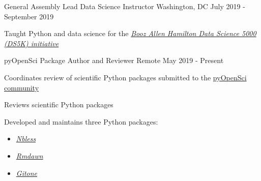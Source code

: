 \begin{cventries}
  \cventry
    {General Assembly} %
    {Lead Data Science Instructor} %
    {Washington, DC} %
    {July 2019 - September 2019} %
    {
      \begin{cvitems} %
        \item {Taught Python and data science for the \href{https://generalassemb.ly/booz-allen-hamilton}{\textcolor{awesome-skyblue}{\textit{Booz Allen Hamilton Data Science 5000 (DS5K) initiative}}}}
      \end{cvitems}
    }

  \cventry
    {pyOpenSci} %
    {Package Author and Reviewer} %
    {Remote} %
    {May 2019 - Present} %
    {
      \begin{cvitems} %
        \item Coordinates review of scientific Python packages submitted to the \href{https://www.pyopensci.org/}{\textcolor{awesome-skyblue}{pyOpenSci} community}
        \item Reviews scientific Python packages
        \item Developed and maintains three Python packages: \\
            \begin{minipage}[t]{0.15\textwidth}
             \begin{itemize}
                  \item{ \href{https://py4ds.github.io/nbless/readme.html}{\textit{\textcolor{awesome-skyblue}{Nbless}}}} 
             \end{itemize}
            \end{minipage}
            \begin{minipage}[t]{0.15\textwidth}
             \begin{itemize}
                  \item{ \href{https://py4ds.github.io/rmdawn/readme.html}{\textit{\textcolor{awesome-skyblue}{Rmdawn}}}}
             \end{itemize}
            \end{minipage}
            \begin{minipage}[t]{0.15\textwidth}
             \begin{itemize}
                  \item{ \href{https://py4ds.github.io/gitone/readme.html}{\textit{\textcolor{awesome-skyblue}{Gitone}}}}
             \end{itemize}
            \end{minipage}
      \end{cvitems}
    }


\end{cventries}
